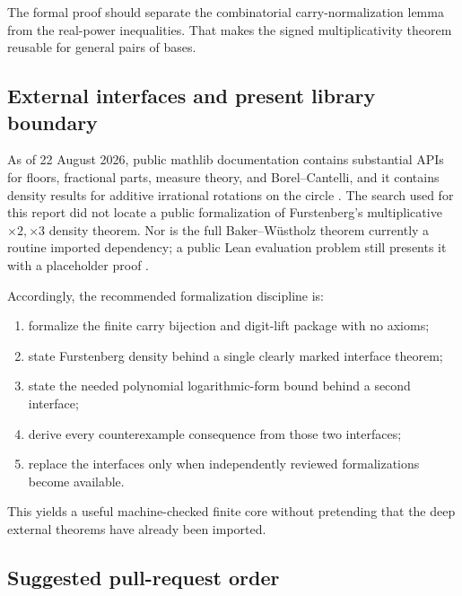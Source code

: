 \documentclass[11pt]{article}
\theoremstyle{definition}
\theoremstyle{remark}
\begin{document}
The formal proof should separate the combinatorial carry-normalization lemma from the
real-power inequalities.  That makes the signed multiplicativity theorem reusable for
general pairs of bases.

\subsection{External interfaces and present library boundary}

As of 22 August 2026, public mathlib documentation contains substantial APIs for
floors, fractional parts, measure theory, and Borel--Cantelli, and it contains density
results for additive irrational rotations on the circle
\cite{MathlibFloor2026,MathlibBorelCantelli2026,MathlibDenseCircle2026}.  The search
used for this report did not locate a public formalization of Furstenberg's
multiplicative $\times2,\times3$ density theorem.  Nor is the full Baker--W\"ustholz
theorem currently a routine imported dependency; a public Lean evaluation problem
still presents it with a placeholder proof \cite{LeanBaker2026}.

Accordingly, the recommended formalization discipline is:
\begin{enumerate}
\item formalize the finite carry bijection and digit-lift package with no axioms;
\item state Furstenberg density behind a single clearly marked interface theorem;
\item state the needed polynomial logarithmic-form bound behind a second interface;
\item derive every counterexample consequence from those two interfaces;
\item replace the interfaces only when independently reviewed formalizations become
available.
\end{enumerate}
This yields a useful machine-checked finite core without pretending that the deep
external theorems have already been imported.

\subsection{Suggested pull-request order}
\end{document}
